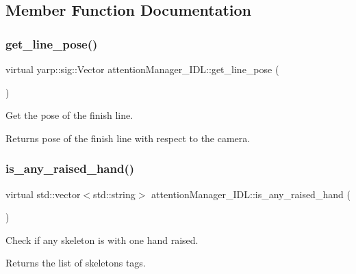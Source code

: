 \subsection{Member Function Documentation}
\mbox{\label{classattentionManager__IDL_a6f5a9c4bfb514d44ebc41e16b320a92b}} 
\subsubsection{\texorpdfstring{get\+\_\+line\+\_\+pose()}{get\_line\_pose()}}
{\footnotesize\ttfamily virtual yarp\+::sig\+::\+Vector attention\+Manager\+\_\+\+I\+D\+L\+::get\+\_\+line\+\_\+pose (\begin{DoxyParamCaption}{ }\end{DoxyParamCaption})\hspace{0.3cm}{\ttfamily [virtual]}}



Get the pose of the finish line. 

\begin{DoxyReturn}{Returns}
pose of the finish line with respect to the camera. 
\end{DoxyReturn}
\mbox{\label{classattentionManager__IDL_ad0b7882cea4dd8b0269cd3eaf0f5dbae}} 
\subsubsection{\texorpdfstring{is\+\_\+any\+\_\+raised\+\_\+hand()}{is\_any\_raised\_hand()}}
{\footnotesize\ttfamily virtual std\+::vector$<$std\+::string$>$ attention\+Manager\+\_\+\+I\+D\+L\+::is\+\_\+any\+\_\+raised\+\_\+hand (\begin{DoxyParamCaption}{ }\end{DoxyParamCaption})\hspace{0.3cm}{\ttfamily [virtual]}}



Check if any skeleton is with one hand raised. 

\begin{DoxyReturn}{Returns}
the list of skeletons\textquotesingle{} tags. 
\end{DoxyReturn}
\mbox{\label{classattentionManager__IDL_a03b844a8bd3d6e2b4cf5ba88ace27429}} 

